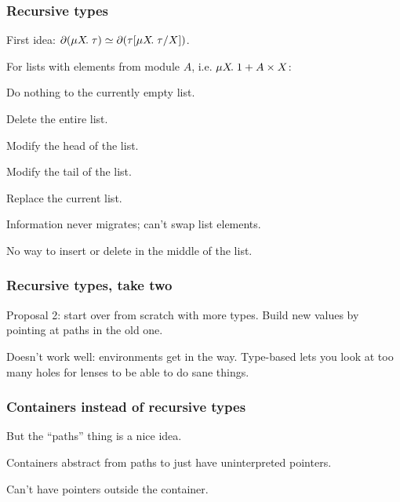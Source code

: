 \documentclass{beamer}
\begin{document}

\begin{frame}
    \frametitle{Recursive types}
    First idea: $\partial(\mu X\!.\;\tau)\simeq\partial(\tau[\mu X\!.\;\tau/X])$.

    For lists with elements from module $A$, i.e. $\mu X\!.\;1+A \times X$:

    \begin{description}[$\mlstayr{\mlright\dx}$]
        \item[$\mlstayl\anything$] Do nothing to the currently empty list.
        \item[$\mlswitch_{\anything L}(\anything)$] Delete the entire list.
        \item[$\mlstayr{\mlleft{\d a}}$] Modify the head of the list.
        \item[$\mlstayr{\mlright\dx}$] Modify the tail of the list.
        \item[$\mlswitch_{\anything R}(\anything)$] Replace the current
            list.
    \end{description}

    Information never migrates; can't swap list elements.

    \alert{No way to insert or delete in the middle of the list.}

\end{frame}

\begin{frame}
    \frametitle{Recursive types, take two}
    Proposal 2: start over from scratch with more types. Build new values by
    pointing at paths in the old one.

    Doesn't work well: environments get in the way. Type-based lets you look
    at too many holes for lenses to be able to do sane things.
\end{frame}

\begin{frame}
    \frametitle{Containers instead of recursive types}
    But the ``paths'' thing is a nice idea.

    Containers abstract from paths to just have uninterpreted pointers.

    Can't have pointers outside the container.
\end{frame}
\end{document}
